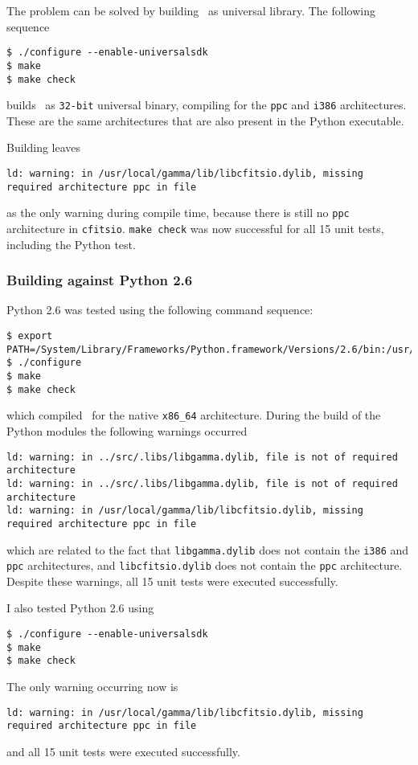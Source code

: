 \documentclass{article}[12pt,a4]
\begin{document}
The problem can be solved by building \this\ as universal library.
The following sequence
{\small\begin{verbatim}
$ ./configure --enable-universalsdk
$ make
$ make check
\end{verbatim}}
builds \this\ as {\tt 32-bit} universal binary, compiling for the {\tt ppc} and {\tt i386}
architectures.
These are the same architectures that are also present in the Python executable.

Building leaves
{\small\begin{verbatim}
ld: warning: in /usr/local/gamma/lib/libcfitsio.dylib, missing required architecture ppc in file
\end{verbatim}}
as the only warning during compile time, because there is still no {\tt ppc} architecture in
{\tt cfitsio}.
{\tt make check} was now successful for all 15 unit tests, including the Python test.


\subsubsection{Building against Python 2.6}

Python 2.6 was tested using the following command sequence:
{\small\begin{verbatim}
$ export PATH=/System/Library/Frameworks/Python.framework/Versions/2.6/bin:/usr/bin:/bin:/usr/sbin:/sbin
$ ./configure
$ make
$ make check
\end{verbatim}}
which compiled \this\ for the native {\tt x86\_64} architecture.
During the build of the Python modules the following warnings occurred
{\small\begin{verbatim}
ld: warning: in ../src/.libs/libgamma.dylib, file is not of required architecture
ld: warning: in ../src/.libs/libgamma.dylib, file is not of required architecture
ld: warning: in /usr/local/gamma/lib/libcfitsio.dylib, missing required architecture ppc in file
\end{verbatim}}
which are related to the fact that {\tt libgamma.dylib} does not contain the
{\tt i386} and {\tt ppc} architectures, and {\tt libcfitsio.dylib} does not contain the
{\tt ppc} architecture.
Despite these warnings, all 15 unit tests were executed successfully.

I also tested Python 2.6 using
{\small\begin{verbatim}
$ ./configure --enable-universalsdk
$ make
$ make check
\end{verbatim}}
The only warning occurring now is
{\small\begin{verbatim}
ld: warning: in /usr/local/gamma/lib/libcfitsio.dylib, missing required architecture ppc in file
\end{verbatim}}
and all 15 unit tests were executed successfully.
\end{document}
